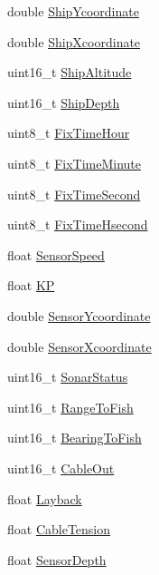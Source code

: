 \begin{DoxyCompactItemize}
\item 
double \hyperlink{structXtfPingHeader_ab1a8a86c74041b26c3c57414a4334471}{Ship\+Ycoordinate}
\item 
double \hyperlink{structXtfPingHeader_ad0b2b9ce11483ac7cb2dae940adc2494}{Ship\+Xcoordinate}
\item 
uint16\+\_\+t \hyperlink{structXtfPingHeader_a91637a56cb34850d47f7affdff9ae967}{Ship\+Altitude}
\item 
uint16\+\_\+t \hyperlink{structXtfPingHeader_acfd6401290226590c1689128d1cd6c6a}{Ship\+Depth}
\item 
uint8\+\_\+t \hyperlink{structXtfPingHeader_a0acfacef5b080e9daaf0372fb2de0e8b}{Fix\+Time\+Hour}
\item 
uint8\+\_\+t \hyperlink{structXtfPingHeader_ab083bd57394263b12397c8998803c8d3}{Fix\+Time\+Minute}
\item 
uint8\+\_\+t \hyperlink{structXtfPingHeader_af0f1df7af2780f44a761088e39275f77}{Fix\+Time\+Second}
\item 
uint8\+\_\+t \hyperlink{structXtfPingHeader_a02193e8b01a4440498c2405bb239e39e}{Fix\+Time\+Hsecond}
\item 
float \hyperlink{structXtfPingHeader_a55322e3af7f8895c8fc493644715d21d}{Sensor\+Speed}
\item 
float \hyperlink{structXtfPingHeader_a52d43640d8029af34ec7bad88dc19bfd}{KP}
\item 
double \hyperlink{structXtfPingHeader_a2d51d2bd0532584e772d3a9d4fa4d09c}{Sensor\+Ycoordinate}
\item 
double \hyperlink{structXtfPingHeader_ac492dc2fe343118cad441c37c9c9e1d9}{Sensor\+Xcoordinate}
\item 
uint16\+\_\+t \hyperlink{structXtfPingHeader_a34f81bc6328cf5b2ca6fc95a5218c225}{Sonar\+Status}
\item 
uint16\+\_\+t \hyperlink{structXtfPingHeader_ab4d9254168e925706b8f086e1e4b0052}{Range\+To\+Fish}
\item 
uint16\+\_\+t \hyperlink{structXtfPingHeader_ac80b2d492aa47cde1d5f2e5ee2ef4d2b}{Bearing\+To\+Fish}
\item 
uint16\+\_\+t \hyperlink{structXtfPingHeader_a2aedefaeb24eb43b69e0499a8ad40ebc}{Cable\+Out}
\item 
float \hyperlink{structXtfPingHeader_aa495554086770426cfc8b906b54d6150}{Layback}
\item 
float \hyperlink{structXtfPingHeader_acdc978a55b0a9d8b1bc3180e86b203d3}{Cable\+Tension}
\item 
float \hyperlink{structXtfPingHeader_a5fb2a907631646b772c4795d09efa298}{Sensor\+Depth}

\end{DoxyCompactItemize}
